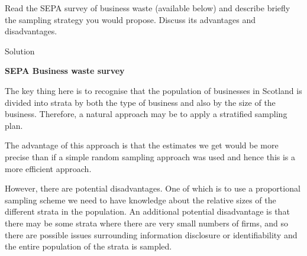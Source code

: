 \documentclass[
  letterpaper,
  DIV=11,
  numbers=noendperiod,
  oneside]{scrartcl}
\begin{document}
\begin{tcolorbox}[enhanced jigsaw, bottomrule=.15mm, breakable, bottomtitle=1mm, colback=white, titlerule=0mm, colbacktitle=quarto-callout-tip-color!10!white, rightrule=.15mm, toptitle=1mm, left=2mm, opacityback=0, toprule=.15mm, arc=.35mm, title={Task 12}, colframe=quarto-callout-tip-color-frame, coltitle=black, leftrule=.75mm, opacitybacktitle=0.6]

Read the SEPA survey of business waste (available below) and describe
briefly the sampling strategy you would propose. Discuss its advantages
and disadvantages.

Solution

\textbf{SEPA Business waste survey}

The key thing here is to recognise that the population of businesses in
Scotland is divided into strata by both the type of business and also by
the size of the business. Therefore, a natural approach may be to apply
a stratified sampling plan.

The advantage of this approach is that the estimates we get would be
more precise than if a simple random sampling approach was used and
hence this is a more efficient approach.

However, there are potential disadvantages. One of which is to use a
proportional sampling scheme we need to have knowledge about the
relative sizes of the different strata in the population. An additional
potential disadvantage is that there may be some strata where there are
very small numbers of firms, and so there are possible issues
surrounding information disclosure or identifiability and the entire
population of the strata is sampled.

\end{tcolorbox}
\end{document}
